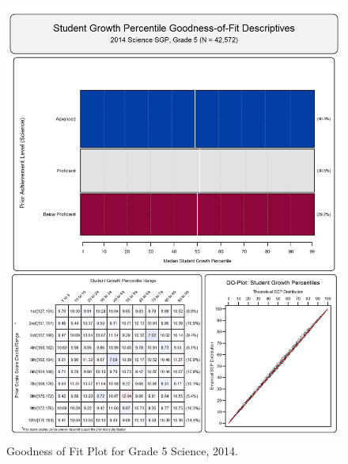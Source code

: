 \documentclass[12pt]{article}
\begin{document}
\begin{figure}[htbp]
\centering
\includegraphics{../img/Goodness_of_Fit/SCIENCE.2014/2014_SCIENCE_5;2013_SCIENCE_4.png}
\caption{Goodness of Fit Plot for Grade 5 Science, 2014.}
\end{figure}
\end{document}
